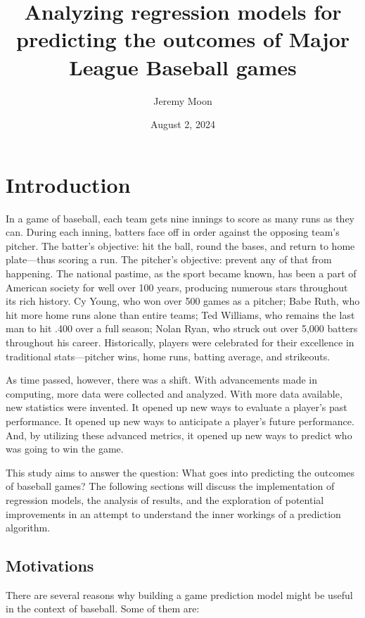 \documentclass{paper}
\title{Analyzing regression models for predicting the outcomes of Major League Baseball games}
\author[1]{Jeremy Moon}
\affil[1]{Institute for Computing in Research}
\date{August 2, 2024}
\begin{document}
\maketitle

\section{Introduction}
In a game of baseball, each team gets nine innings to score as many runs as they can. During each inning, batters face off in order against the opposing team's pitcher. The batter's objective: hit the ball, round the bases, and return to home plate---thus scoring a run. The pitcher's objective: prevent any of that from happening. The national pastime, as the sport became known, has been a part of American society for well over 100 years, producing numerous stars throughout its rich history. Cy Young, who won over 500 games as a pitcher; Babe Ruth, who hit more home runs alone than entire teams; Ted Williams, who remains the last man to hit .400 over a full season; Nolan Ryan, who struck out over 5,000 batters throughout his career. Historically, players were celebrated for their excellence in traditional stats---pitcher wins, home runs, batting average, and strikeouts.

As time passed, however, there was a shift. With advancements made in computing, more data were collected and analyzed. With more data available, new statistics were invented. It opened up new ways to evaluate a player's past performance. It opened up new ways to anticipate a player's future performance. And, by utilizing these advanced metrics, it opened up new ways to predict who was going to win the game.

This study aims to answer the question: What goes into predicting the outcomes of baseball games? The following sections will discuss the implementation of regression models, the analysis of results, and the exploration of potential improvements in an attempt to understand the inner workings of a prediction algorithm.

\subsection{Motivations}
There are several reasons why building a game prediction model might be useful in the context of baseball. Some of them are:
\end{document}
